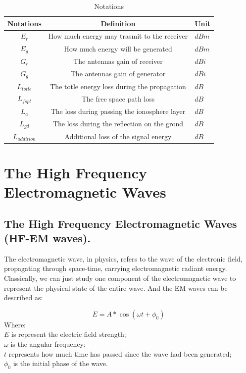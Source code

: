 \documentclass{mcmthesis}
\begin{document}
    \begin{table}[h]
      \centering
        \begin{tabular}{|c|c|l|}

          \hline Notations & Definition & Unit \\
          \hline $E_{r}$ & How much energy may trasmit to the receiver & $dBm$ \\
          \hline $E_{g}$ & How much energy will be generated & $dBm$ \\
          \hline $G_{r}$ & The antennas gain of receiver & $dBi$ \\
          \hline $G_{g}$ & The antennas gain of generator & $dBi$ \\
          \hline $L_{totle}$ & The totle energy loss during the propagation & $dB$ \\
          \hline $L_{fspl}$ & The free space path loss & $dB$ \\
          \hline $L_{a}$ & The loss during passing the ionosphere layer & $dB$ \\
          \hline $L_{gd}$ & The loss during the reflection on the grond & $dB$ \\
          \hline $L_{addition}$ & Additional loss of the signal energy & $dB$ \\
          \hline

        \end{tabular}
        \caption{Notations}
    		\label{tab:Notations}
    \end{table}



\section{The High Frequency Electromagnetic Waves}
  \subsection{The High Frequency Electromagnetic Waves (HF-EM waves).}

    The electromagnetic wave, in physics, refers to the wave of the electronic field, propagating through space-time, carrying electromagnetic radiant energy. Classically, we can just study one component of the electromagnetic wave to represent the physical state of the entire wave. And the EM waves can be described as:

      \begin{equation}\label{eq:EMW}
        E = A * \cos(\omega t + \phi_{0})
      \end{equation}
      Where: \\
      $E$ is represent the electric field strength; \\
      $\omega$ is the angular frequency;\\
      $t$ represents how much time has passed since the wave had been generated;\\
      $\phi_{0}$ is the initial phase of the wave.\\
\end{document}
